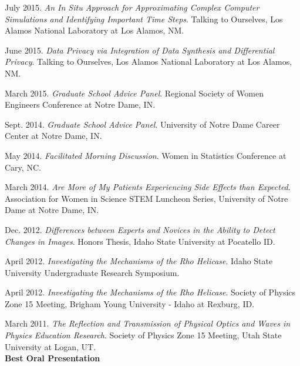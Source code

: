 \documentclass[11pt, letterpaper, roman]{moderncv} %
\begin{document}
\begin{etaremune}[topsep=0pt, itemsep=6pt, partopsep=0pt, parsep=0pt]
  \item July 2015. \textit{An In Situ Approach for Approximating Complex Computer Simulations and Identifying Important Time Steps}. Talking to Ourselves, Los Alamos National Laboratory at Los Alamos, NM.

  \item June 2015. \textit{Data Privacy via Integration of Data Synthesis and Differential Privacy}. Talking to Ourselves, Los Alamos National Laboratory at Los Alamos, NM. 
  
  \item March 2015. \textit{Graduate School Advice Panel}.  Regional Society of Women Engineers Conference at Notre Dame, IN.
  
  \item Sept. 2014. \textit{Graduate School Advice Panel}.  University of Notre Dame Career Center at Notre Dame, IN.
  
  \item May 2014. \textit{Facilitated Morning Discussion}. Women in Statistics Conference at Cary, NC.
  
  \item March 2014. \textit{Are More of My Patients Experiencing Side Effects than Expected}. Association for Women in Science STEM Luncheon Series, University of Notre Dame at Notre Dame, IN.
  
  \item Dec. 2012. \textit{Differences between Experts and Novices in the Ability to Detect Changes in Images}. Honors Thesis, Idaho State University at Pocatello ID.

  \item April 2012. \textit{Investigating the Mechanisms of the Rho Helicase}. Idaho State University Undergraduate Research Symposium.

  \item April 2012. \textit{Investigating the Mechanisms of the Rho Helicase}. Society of Physics Zone 15 Meeting, Brigham Young University - Idaho at Rexburg, ID.

  \item March 2011. \textit{The Reflection and Transmission of Physical Optics and Waves in Physics Education Research}. Society of Physics Zone 15 Meeting, Utah State University at Logan, UT.\\
  \textbf{Best Oral Presentation}
  


\end{etaremune}
\end{document}
